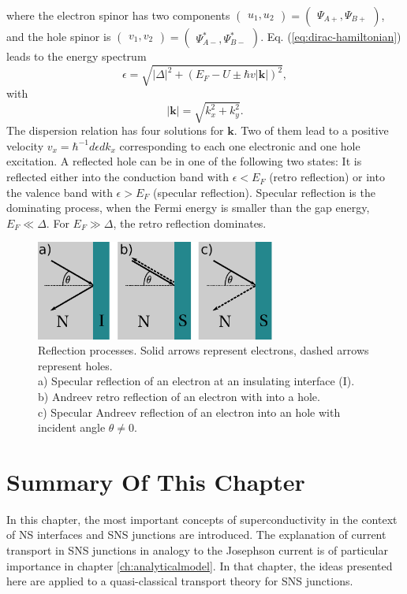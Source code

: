 where the electron spinor has two components $\begin{pmatrix} u_1, u_2\end{pmatrix} = \begin{pmatrix} \Psi_{A+}, \Psi_{B+} \end{pmatrix}$, and the hole spinor is $\begin{pmatrix} v_1, v_2\end{pmatrix} = \begin{pmatrix} \Psi^{*}_{A-},  \Psi^{*}_{B-} \end{pmatrix}$.
Eq. (\ref{eq:dirac-hamiltonian}) leads to the energy spectrum
\begin{equation}
\epsilon = \sqrt{|\Delta|^2 + \left( E_F - U \pm \hbar v |\mathbf{k}|\right) ^2},  
\end{equation}
with
\begin{equation}
|\mathbf{k}| = \sqrt{k_x^2 + k_y^2}.
\end{equation}
The dispersion relation has four solutions for $\mathbf{k}$. Two of them lead to a positive velocity $v_x = \hbar^{-1} d \epsilon d k_x$ corresponding to each one electronic and one hole excitation. A reflected hole can be in one of the following two states: It is reflected either into the conduction band with $\epsilon < E_F$ (retro reflection) or into the valence band with $\epsilon > E_F$ (specular reflection). Specular reflection is the dominating process, when the Fermi energy is smaller than the gap energy, $E_F \ll \Delta$. For $E_F \gg \Delta$, the retro reflection dominates. 
\begin{figure}
\centering
\includegraphics[width=0.7\textwidth]{figure/framework-analytical/specular-reflection_csch}
\caption{Reflection processes. Solid arrows represent electrons, dashed arrows represent holes. \\ a) Specular reflection of an electron at an insulating interface (I). \\ b) Andreev retro reflection of an electron with into a hole. \\ c) Specular Andreev reflection of an electron into an hole with incident angle $\theta \neq 0$.}\label{fig:specular-sns}
\end{figure}
\section{Summary Of This Chapter}
In this chapter, the most important concepts of superconductivity in the context of NS interfaces and SNS junctions are introduced. The explanation of current transport in SNS junctions in analogy to the Josephson current is of particular importance in chapter \ref{ch:analyticalmodel}. In that chapter, the ideas presented here are applied to a quasi-classical transport theory for SNS junctions.

 
